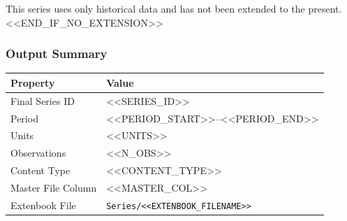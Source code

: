 This series uses only historical data and has not been extended to the present.
<<END_IF_NO_EXTENSION>>

\subsubsection{Output Summary}

\begin{tabular}{@{} l l @{}}
\toprule
\textbf{Property} & \textbf{Value} \\
\midrule
Final Series ID     & <<SERIES_ID>> \\
Period              & <<PERIOD_START>>--<<PERIOD_END>> \\
Units               & <<UNITS>> \\
Observations        & <<N_OBS>> \\
Content Type        & <<CONTENT_TYPE>> \\
Master File Column  & <<MASTER_COL>> \\
Extenbook File      & \texttt{Series/<<EXTENBOOK_FILENAME>>} \\
\bottomrule
\end{tabular}

\bigskip
